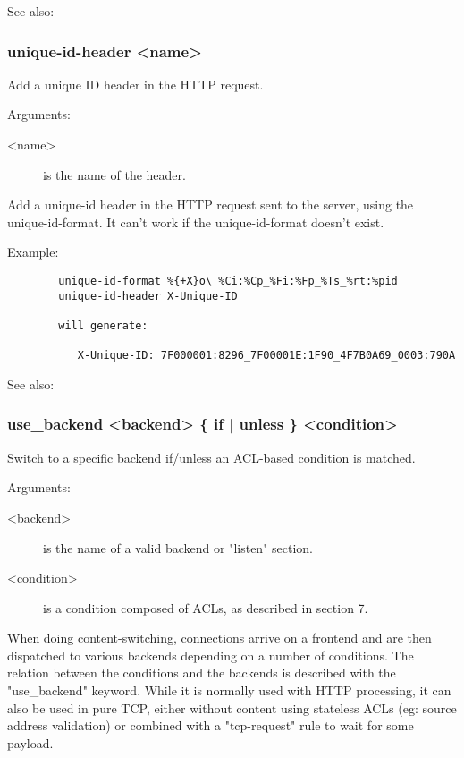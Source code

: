   See also: 

\subsubsection[unique-id-header]{unique-id-header <name>}


  Add a unique ID header in the HTTP request.


  Arguments:
  \begin{description}
  \item[<name>] is the name of the header.
  \end{description}

  Add a unique-id header in the HTTP request sent to the server, using the
  unique-id-format. It can't work if the unique-id-format doesn't exist.

  Example:
\begin{verbatim}
        unique-id-format %{+X}o\ %Ci:%Cp_%Fi:%Fp_%Ts_%rt:%pid
        unique-id-header X-Unique-ID

        will generate:

           X-Unique-ID: 7F000001:8296_7F00001E:1F90_4F7B0A69_0003:790A
\end{verbatim}
    See also: 

\subsubsection[use\_backend]{use\_backend <backend> \{ if | unless \} <condition>}


  Switch to a specific backend if/unless an ACL-based condition is matched.


  Arguments:
  \begin{description}
  \item[<backend>] is the name of a valid backend or "listen" section.
  \item[<condition>] is a condition composed of ACLs, as described in section 7.
  \end{description}

  When doing content-switching, connections arrive on a frontend and are then
  dispatched to various backends depending on a number of conditions. The
  relation between the conditions and the backends is described with the
  "use\_backend" keyword. While it is normally used with HTTP processing, it can
  also be used in pure TCP, either without content using stateless ACLs (eg:
  source address validation) or combined with a "tcp-request" rule to wait for
  some payload.

